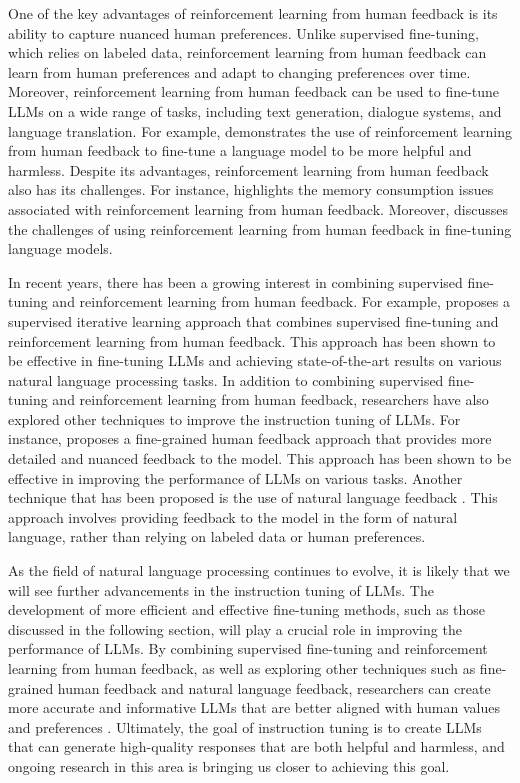 \documentclass[11pt]{article}
\begin{document}
One of the key advantages of reinforcement learning from human feedback is its ability to capture nuanced human preferences. Unlike supervised fine-tuning, which relies on labeled data, reinforcement learning from human feedback can learn from human preferences and adapt to changing preferences over time. Moreover, reinforcement learning from human feedback can be used to fine-tune LLMs on a wide range of tasks, including text generation, dialogue systems, and language translation. For example, \cite{ref43} demonstrates the use of reinforcement learning from human feedback to fine-tune a language model to be more helpful and harmless. Despite its advantages, reinforcement learning from human feedback also has its challenges. For instance, \cite{ref44} highlights the memory consumption issues associated with reinforcement learning from human feedback. Moreover, \cite{ref45} discusses the challenges of using reinforcement learning from human feedback in fine-tuning language models.

In recent years, there has been a growing interest in combining supervised fine-tuning and reinforcement learning from human feedback. For example, \cite{ref46} proposes a supervised iterative learning approach that combines supervised fine-tuning and reinforcement learning from human feedback. This approach has been shown to be effective in fine-tuning LLMs and achieving state-of-the-art results on various natural language processing tasks. In addition to combining supervised fine-tuning and reinforcement learning from human feedback, researchers have also explored other techniques to improve the instruction tuning of LLMs. For instance, \cite{ref47} proposes a fine-grained human feedback approach that provides more detailed and nuanced feedback to the model. This approach has been shown to be effective in improving the performance of LLMs on various tasks. Another technique that has been proposed is the use of natural language feedback \cite{ref48}. This approach involves providing feedback to the model in the form of natural language, rather than relying on labeled data or human preferences.

As the field of natural language processing continues to evolve, it is likely that we will see further advancements in the instruction tuning of LLMs. The development of more efficient and effective fine-tuning methods, such as those discussed in the following section, will play a crucial role in improving the performance of LLMs. By combining supervised fine-tuning and reinforcement learning from human feedback, as well as exploring other techniques such as fine-grained human feedback and natural language feedback, researchers can create more accurate and informative LLMs that are better aligned with human values and preferences \cite{ref49}. Ultimately, the goal of instruction tuning is to create LLMs that can generate high-quality responses that are both helpful and harmless, and ongoing research in this area is bringing us closer to achieving this goal.
\end{document}
